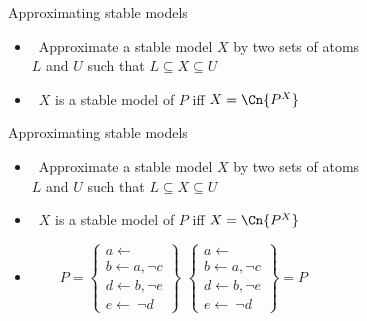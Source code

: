 \begin{frame}{Approximating stable models}
  \medskip
  \begin{itemize}
  \item {} \ Approximate a stable model $X$ by two sets of atoms\\
    $L$ and $U$ such that
    \(
    L\subseteq X\subseteq U
    \)
    \smallskip
  \item {} \ $X$ is a stable model of $P$ iff $X=\Cn{P^X}$
  \end{itemize}
\end{frame}
\begin{frame}{Approximating stable models}
  \medskip
  \begin{itemize}
  \item {} \ Approximate a stable model $X$ by two sets of atoms\\
    $L$ and $U$ such that
    \(
    L\subseteq X\subseteq U
    \)
    \smallskip
  \item {} \ $X$ is a stable model of $P$ iff $X=\Cn{P^X}$
    \smallskip
  \item {}
    \par\bigskip
    \(
    \qquad
    P
    =
    \left\{
      \begin{array}{l}
        a\leftarrow\\  b\leftarrow a,\neg c\\ d\leftarrow b,\neg e\\ e\leftarrow~\neg d
      \end{array}
    \right\}
    \)
    \hfill
    \(
    \left\{
      \begin{array}{l}
        a\leftarrow\\  b\leftarrow a,\neg c\\ d\leftarrow b,\neg e\\ e\leftarrow~\neg d
      \end{array}
    \right\}
    =
    P
    \qquad
    \qquad
    \)
  \end{itemize}
\end{frame}
%
